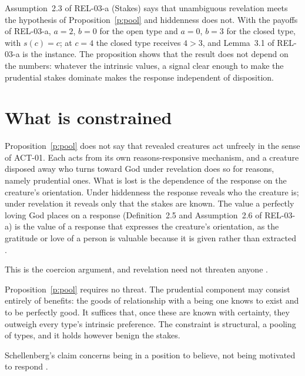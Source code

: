 \documentclass{situationist-preprint}
\begin{document}
Assumption~2.3 of REL-03-a (Stakes) says that unambiguous revelation meets the hypothesis of Proposition~\ref{p:pool} and hiddenness does not. With the payoffs of REL-03-a, $a = 2$, $b = 0$ for the open type and $a = 0$, $b = 3$ for the closed type, with $s(c) = c$; at $c = 4$ the closed type receives $4 > 3$, and Lemma~3.1 of REL-03-a is the instance. The proposition shows that the result does not depend on the numbers: whatever the intrinsic values, a signal clear enough to make the prudential stakes dominate makes the response independent of disposition.

\section{What is constrained}

Proposition~\ref{p:pool} does not say that revealed creatures act unfreely in the sense of ACT-01. Each acts from its own reasons-responsive mechanism, and a creature disposed away who turns toward God under revelation does so for reasons, namely prudential ones. What is lost is the dependence of the response on the creature's orientation. Under hiddenness the response reveals who the creature is; under revelation it reveals only that the stakes are known. The value a perfectly loving God places on a response (Definition~2.5 and Assumption~2.6 of REL-03-a) is the value of a response that expresses the creature's orientation, as the gratitude or love of a person is valuable because it is given rather than extracted \citep{Hick1966}.

\begin{objection}
This is the coercion argument, and revelation need not threaten anyone \citep{Murray1993}.
\end{objection}

\begin{reply}
Proposition~\ref{p:pool} requires no threat. The prudential component may consist entirely of benefits: the goods of relationship with a being one knows to exist and to be perfectly good. It suffices that, once these are known with certainty, they outweigh every type's intrinsic preference. The constraint is structural, a pooling of types, and it holds however benign the stakes.
\end{reply}

\begin{objection}
Schellenberg's claim concerns being in a position to believe, not being motivated to respond \citep{Schellenberg1993}.
\end{objection}
\end{document}
